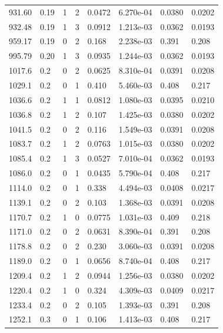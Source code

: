 \documentclass[preview]{standalone}
\begin{document}
{{{\begin{tabular}{L{1.2cm}C{1.2cm} C{0.3cm}C{0.5cm} C{1.4cm}C{1.4cm} C{1.4cm}C{1.4cm}}
  931.60  &  0.19  & 1     &  2 &  0.0472  & 6.270e-04  & 0.0380 &  0.0202   \\ 
  932.48  &  0.19  & 1     &  3 &  0.0912  & 1.213e-03  & 0.0362 &  0.0193   \\ 
  959.17  &  0.19  & 0     &  2 &  0.168  & 2.238e-03  & 0.391 &  0.208   \\ 
  995.79  &  0.20  & 1     &  3 &  0.0935  & 1.244e-03  & 0.0362 &  0.0193   \\ 
  1017.6  &   0.2  & 0     &  2 &  0.0625  & 8.310e-04  & 0.0391 &  0.0208   \\ 
  1029.1  &   0.2  & 0     &  1 &  0.410  & 5.460e-03  & 0.408 &  0.217   \\ 
  1036.6  &   0.2  & 1     &  1 &  0.0812  & 1.080e-03  & 0.0395 &  0.0210   \\ 
  1036.8  &   0.2  & 1     &  2 &  0.107  & 1.425e-03  & 0.0380 &  0.0202   \\ 
  1041.5  &   0.2  & 0     &  2 &  0.116  & 1.549e-03  & 0.0391 &  0.0208   \\ 
  1083.7  &   0.2  & 1     &  2 &  0.0763  & 1.015e-03  & 0.0380 &  0.0202   \\ 
  1085.4  &   0.2  & 1     &  3 &  0.0527  & 7.010e-04  & 0.0362 &  0.0193   \\ 
  1086.0  &   0.2  & 0     &  1 &  0.0435  & 5.790e-04  & 0.408 &  0.217   \\ 
  1114.0  &   0.2  & 0     &  1 &  0.338  & 4.494e-03  & 0.0408 &  0.0217   \\ 
  1139.1  &   0.2  & 0     &  2 &  0.103  & 1.368e-03  & 0.0391 &  0.0208   \\ 
  1170.7  &   0.2  & 1     &  0 &  0.0775  & 1.031e-03  & 0.409 &  0.218   \\ 
  1171.0  &   0.2  & 0     &  2 &  0.0631  & 8.390e-04  & 0.391 &  0.208   \\ 
  1178.8  &   0.2  & 0     &  2 &  0.230  & 3.060e-03  & 0.0391 &  0.0208   \\ 
  1189.0  &   0.2  & 0     &  1 &  0.0656  & 8.740e-04  & 0.408 &  0.217   \\ 
  1209.4  &   0.2  & 1     &  2 &  0.0944  & 1.256e-03  & 0.0380 &  0.0202   \\ 
  1220.4  &   0.2  & 1     &  0 &  0.324  & 4.309e-03  & 0.0409 &  0.0217   \\ 
  1233.4  &   0.2  & 0     &  2 &  0.105  & 1.393e-03  & 0.391 &  0.208   \\ 
  1252.1  &   0.3  & 0     &  1 &  0.106  & 1.413e-03  & 0.408 &  0.217   \\ 

\end{tabular}}}}
\end{document}
